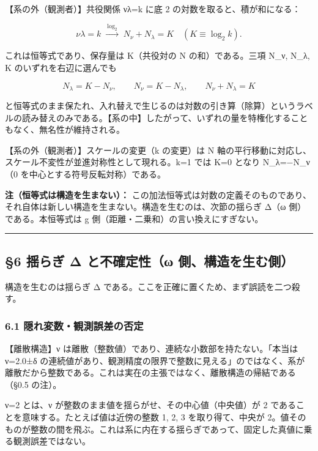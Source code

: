 \documentclass[11pt]{ltjsarticle}
\begin{document}
【系の外（観測者）】共役関係 νλ=k に底 2 の対数を取ると、積が和になる：

\[\nu\lambda=k \;\xrightarrow{\ \log_2\ }\; N_\nu + N_\lambda = K \quad(K\equiv\log_2 k).\]

これは恒等式であり、保存量は K（共役対の N の和）である。三項 N\_ν,
N\_λ, K のいずれを右辺に選んでも

\[N_\lambda = K - N_\nu,\qquad N_\nu = K - N_\lambda,\qquad N_\nu + N_\lambda = K\]

と恒等式のまま保たれ、入れ替えで生じるのは対数の引き算（除算）というラベルの読み替えのみである。【系の中】したがって、いずれの量を特権化することもなく、無名性が維持される。

【系の外（観測者）】スケールの変更（k の変更）は N
軸の平行移動に対応し、スケール不変性が並進対称性として現れる。k=1 では
K=0 となり N\_λ=−N\_ν（0 を中心とする符号反転対称）である。

\textbf{注（恒等式は構造を生まない）：}
この加法恒等式は対数の定義そのものであり、それ自体は新しい構造を生まない。構造を生むのは、次節の揺らぎ
Δ（ω 側）である。本恒等式は g 側（距離・二乗和）の言い換えにすぎない。

\begin{center}\rule{0.5\linewidth}{0.5pt}\end{center}

\subsection{§6 揺らぎ Δ と不確定性（ω
側、構造を生む側）}\label{ux63faux3089ux304e-ux3b4-ux3068ux4e0dux78baux5b9aux6027ux3c9-ux5074ux69cbux9020ux3092ux751fux3080ux5074}

構造を生むのは揺らぎ Δ
である。ここを正確に置くため、まず誤読を二つ殺す。

\subsubsection{6.1
隠れ変数・観測誤差の否定}\label{ux96a0ux308cux5909ux6570ux89b3ux6e2cux8aa4ux5deeux306eux5426ux5b9a}

【離散構造】ν は離散（整数値）であり、連続な小数部を持たない。「本当は
ν=2.0±δ
の連続値があり、観測精度の限界で整数に見える」のではなく、系が離散だから整数である。これは実在の主張ではなく、離散構造の帰結である（§0.5
の注）。

ν=2 とは、ν が整数のまま値を揺らがせ、その中心値（中央値）が 2
であることを意味する。たとえば値は近傍の整数 1, 2, 3 を取り得て、中央が
2。値そのものが整数の間を飛ぶ。これは系に内在する揺らぎであって、固定した真値に乗る観測誤差ではない。
\end{document}
